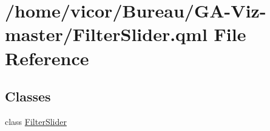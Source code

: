 \hypertarget{_filter_slider_8qml}{}\section{/home/vicor/\+Bureau/\+G\+A-\/\+Viz-\/master/\+Filter\+Slider.qml File Reference}
\label{_filter_slider_8qml}
\subsection*{Classes}
\begin{DoxyCompactItemize}
\item 
class \hyperlink{class_filter_slider}{Filter\+Slider}
\end{DoxyCompactItemize}
